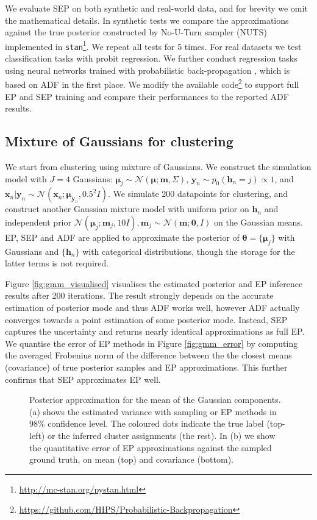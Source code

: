 We evaluate SEP on both synthetic and real-world data, and for brevity we omit the mathematical details. In synthetic tests we compare the approximations against the true posterior constructed by No-U-Turn sampler (NUTS) \cite{hoffman:nuts} implemented in \texttt{stan}\footnote{\url{http://mc-stan.org/pystan.html}}. We repeat all tests for 5 times.
%
For real datasets we test classification tasks with probit regression. We further conduct regression tasks using neural networks trained with probabilistic back-propagation \cite{miguel:pbp}, which is based on ADF in the first place. We modify the available code\footnote{\url{https://github.com/HIPS/Probabilistic-Backpropagation}} to support full EP and SEP training and compare their performances to the reported ADF results.

%
\subsection{Mixture of Gaussians for clustering}
We start from clustering using mixture of Gaussians. We construct the simulation model with $J=4$ Gaussians: $\bm{\mu}_j \sim \mathcal{N}(\bm{\mu}; \bm{m}, \Sigma)$, $\bm{y}_n \sim p_0(\bm{h}_n = j) \propto 1$, and $\bm{x}_n | \bm{y}_n \sim \mathcal{N}(\bm{x}_n; \bm{\mu}_{\bm{y}_n}, 0.5^2 I)$. We simulate 200 datapoints for clustering, and construct another Gaussian mixture model with uniform prior on $\bm{h}_n$ and independent prior $\mathcal{N}(\bm{\mu}_j; \bm{m}_j, 10I), \bm{m}_j \sim \mathcal{N}(\bm{m}; \bm{0}, I)$ on the Gaussian means. EP, SEP and ADF are applied to approximate the posterior of $\bm{\theta} = \{ \bm{\mu}_j \}$ with Gaussians and $\{\bm{h}_n\}$ with categorical distributions, though the storage for the latter terms is not required. 

Figure \ref{fig:gmm_visualised} visualises the estimated posterior and EP inference results after 200 iterations. The result strongly depends on the accurate estimation of posterior mode and thus ADF works well, however ADF actually converges towards a point estimation of some posterior mode. Instead, SEP captures the uncertainty and returns nearly identical approximations as full EP. We quantise the error of EP methods in Figure \ref{fig:gmm_error} by computing the averaged Frobenius norm of the difference between the the closest means (covariance) of true posterior samples and EP approximations. This further confirms that SEP approximates EP well.

\begin{figure}
\centering
\def\svgwidth{0.50\linewidth}
\subfigure[\label{fig:gmm_visualised}]{
}
%
\hspace{0.1in}
%
\def\svgwidth{0.40\linewidth}
\subfigure[\label{fig:gmm_error}]{
}
\caption{Posterior approximation for the mean of the Gaussian components. (a) shows the estimated variance with sampling or EP methods in 98\% confidence level. The coloured dots indicate the true label (top-left) or the inferred cluster assignments (the rest). In (b) we show the quantitative error of EP approximations against the sampled ground truth, on mean (top) and covariance (bottom).}
\end{figure}

